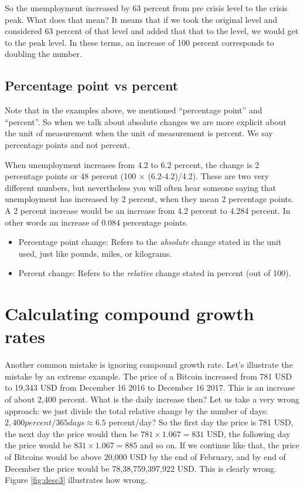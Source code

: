 \documentclass[]{book}
\begin{document}
So the unemployment increased by 63 percent from pre crisis level to the crisis peak. What does that mean? It means that if we took the original level and considered 63 percent of that level and added that that to the level, we would get to the peak level. In these terms, an increase of 100 percent corresponds to doubling the number.

\hypertarget{percentage-point-vs-percent}{%
\subsection{Percentage point vs percent}\label{percentage-point-vs-percent}}

Note that in the examples above, we mentioned ``percentage point'' and ``percent''. So when we talk about absolute changes we are more explicit about the unit of measurement when the unit of measurement is percent. We say percentage points and not percent.

When unemployment increases from 4.2 to 6.2 percent, the change is 2 percentage points or 48 percent (100 \(\times\) (6.2-4.2)/4.2). These are two very different numbers, but nevertheless you will often hear someone saying that unemployment has increased by 2 percent, when they mean 2 percentage points. A 2 percent increase would be an increase from 4.2 percent to 4.284 percent. In other words an increase of 0.084 percentage points.

\begin{itemize}
\item
  Percentage point change: Refers to the \emph{absolute} change stated in the unit used, just like pounds, miles, or kilograms.
\item
  Percent change: Refers to the \emph{relative} change stated in percent (out of 100).
\end{itemize}

\hypertarget{calculating-compound-growth-rates}{%
\section{Calculating compound growth rates}\label{calculating-compound-growth-rates}}

Another common mistake is ignoring compound growth rate. Let's illustrate the mistake by an extreme example. The price of a Bitcoin increased from 781 USD to 19,343 USD from December 16 2016 to December 16 2017. This is an increase of about 2,400 percent. What is the daily increase then? Let us take a very wrong approach: we just divide the total relative change by the number of days: \(2,400percent/365days\approx 6.5\) percent/day? So the first day the price is 781 USD, the next day the price would then be \(781\times1.067=831\) USD, the following day the price would be \(831\times1.067=885\) and so on. If we continue like that, the price of Bitcoins would be above 20,000 USD by the end of February, and by end of December the price would be 78,38,759,397,922 USD. This is clearly wrong. Figure \ref{fig:desc3} illustrates how wrong.
\end{document}
